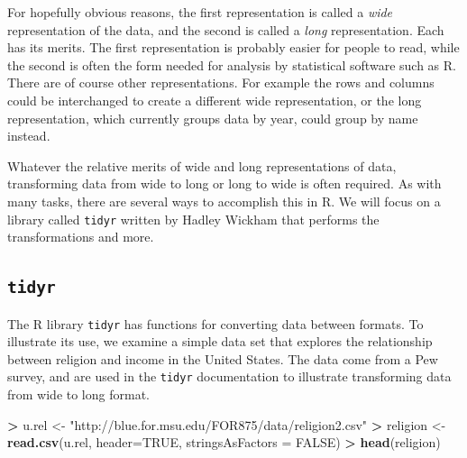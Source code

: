 \documentclass[]{krantz}
\makeatletter
\newenvironment{Shaded}{\begin{snugshade}}{\end{snugshade}}
\newcommand{\KeywordTok}[1]{\textcolor[rgb]{0.27,0.27,0.27}{\textbf{#1}}}
\newcommand{\DataTypeTok}[1]{\textcolor[rgb]{0.27,0.27,0.27}{#1}}
\newcommand{\StringTok}[1]{\textcolor[rgb]{0.5,0.5,0.5}{#1}}
\newcommand{\OtherTok}[1]{\textcolor[rgb]{0.37,0.37,0.37}{#1}}
\newcommand{\OperatorTok}[1]{\textcolor[rgb]{0.43,0.43,0.43}{\textbf{#1}}}
\newcommand{\NormalTok}[1]{#1}
\newenvironment{kframe}{%
\medskip{}
\setlength{\fboxsep}{.8em}
 \def\at@end@of@kframe{}%
 \ifinner\ifhmode%
  \def\at@end@of@kframe{\end{minipage}}%
  \begin{minipage}{\columnwidth}%
 \fi\fi%
 \def\FrameCommand##1{\hskip\@totalleftmargin \hskip-\fboxsep
 \colorbox{shadecolor}{##1}\hskip-\fboxsep
     \hskip-\linewidth \hskip-\@totalleftmargin \hskip\columnwidth}%
 \MakeFramed {\advance\hsize-\width
   \@totalleftmargin\z@ \linewidth\hsize
   \@setminipage}}%
 {\par\unskip\endMakeFramed%
 \at@end@of@kframe}
\renewenvironment{Shaded}{\begin{kframe}}{\end{kframe}}
\makeatother
\begin{document}
For hopefully obvious reasons, the first representation is called a
\emph{wide} representation of the data, and the second is called a
\emph{long} representation. Each has its merits. The first
representation is probably easier for people to read, while the second
is often the form needed for analysis by statistical software such as R.
There are of course other representations. For example the rows and
columns could be interchanged to create a different wide representation,
or the long representation, which currently groups data by year, could
group by name instead.

Whatever the relative merits of wide and long representations of data,
transforming data from wide to long or long to wide is often required.
As with many tasks, there are several ways to accomplish this in R. We
will focus on a library called \texttt{tidyr} written by Hadley Wickham
that performs the transformations and more.

\subsection{\texorpdfstring{\texttt{tidyr}}{tidyr}}\label{tidyr}

The R library \texttt{tidyr} has functions for converting data between
formats. To illustrate its use, we examine a simple data set that
explores the relationship between religion and income in the United
States. The data come from a Pew survey, and are used in the
\texttt{tidyr} documentation to illustrate transforming data from wide
to long format.

\begin{Shaded}
\begin{Highlighting}[]
\OperatorTok{>}\StringTok{ }\NormalTok{u.rel <-}\StringTok{ "http://blue.for.msu.edu/FOR875/data/religion2.csv"}
\OperatorTok{>}\StringTok{ }\NormalTok{religion <-}\StringTok{ }\KeywordTok{read.csv}\NormalTok{(u.rel, }\DataTypeTok{header=}\OtherTok{TRUE}\NormalTok{, }\DataTypeTok{stringsAsFactors =} \OtherTok{FALSE}\NormalTok{)}
\OperatorTok{>}\StringTok{ }\KeywordTok{head}\NormalTok{(religion)}
\end{Highlighting}
\end{Shaded}
\end{document}

